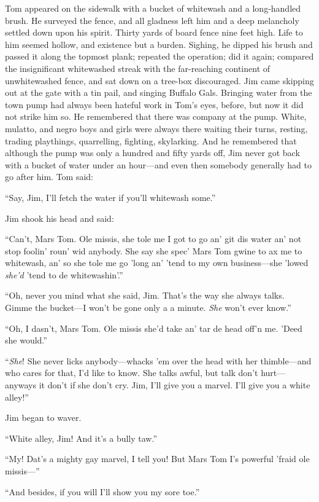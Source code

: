 \documentclass{book}
\begin{document}
Tom appeared on the sidewalk with a bucket of whitewash and a long-handled brush. He surveyed the fence, and all gladness left him and a deep melancholy settled down upon his spirit. Thirty yards of board fence nine feet high. Life to him seemed hollow, and existence but a burden. Sighing, he dipped his brush and passed it along the topmost plank; repeated the operation; did it again; compared the insignificant whitewashed streak with the far-reaching continent of unwhitewashed fence, and sat down on a tree-box discouraged. Jim came skipping out at the gate with a tin pail, and singing Buffalo Gals. Bringing water from the town pump had always been hateful work in Tom’s eyes, before, but now it did not strike him so. He remembered that there was company at the pump. White, mulatto, and negro boys and girls were always there waiting their turns, resting, trading playthings, quarrelling, fighting, skylarking. And he remembered that although the pump was only a hundred and fifty yards off, Jim never got back with a bucket of water under an hour—and even then somebody generally had to go after him. Tom said:

“Say, Jim, I’ll fetch the water if you’ll whitewash some.”

Jim shook his head and said:

“Can’t, Mars Tom. Ole missis, she tole me I got to go an’ git dis water an’ not stop foolin’ roun’ wid anybody. She say she spec’ Mars Tom gwine to ax me to whitewash, an’ so she tole me go ’long an’ ’tend to my own business—she ’lowed \emph{she’d} ’tend to de whitewashin’.”

“Oh, never you mind what she said, Jim. That’s the way she always talks. Gimme the bucket—I won’t be gone only a a minute. \emph{She} won’t ever know.”

“Oh, I dasn’t, Mars Tom. Ole missis she’d take an’ tar de head off’n me. ’Deed she would.”

“\emph{She}! She never licks anybody—whacks ’em over the head with her thimble—and who cares for that, I’d like to know. She talks awful, but talk don’t hurt—anyways it don’t if she don’t cry. Jim, I’ll give you a marvel. I’ll give you a white alley!”

Jim began to waver.

“White alley, Jim! And it’s a bully taw.”

“My! Dat’s a mighty gay marvel, I tell you! But Mars Tom I’s powerful ’fraid ole missis—”

“And besides, if you will I’ll show you my sore toe.”
\end{document}
